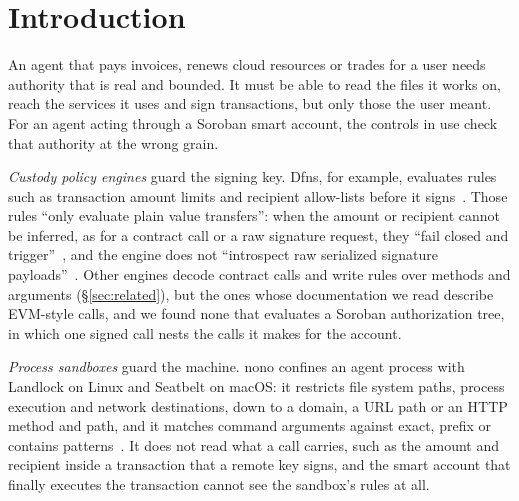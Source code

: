 \section{Introduction}\label{sec:intro}

An agent that pays invoices, renews cloud resources or trades for a user needs
authority that is real and bounded. It must be able to read the files it works
on, reach the services it uses and sign transactions, but only those the user
meant. For an agent acting through a Soroban smart account, the controls in
use check that authority at the wrong grain.

\emph{Custody policy engines} guard the signing key. Dfns, for example,
evaluates rules such as transaction amount limits and recipient allow-lists
before it signs~\cite{dfnsPolicies}. Those rules ``only evaluate plain value
transfers'': when the amount or recipient cannot be inferred, as for a contract
call or a raw signature request, they ``fail closed and
trigger''~\cite{dfnsPolicies}, and the engine does not ``introspect raw
serialized signature payloads''~\cite{dfnsSigningPolicies}. Other engines
decode contract calls and write rules over methods and arguments
(\S\ref{sec:related}), but the ones whose documentation we read describe
EVM-style calls, and we found none that evaluates a Soroban authorization
tree, in which one signed call nests the calls it makes for the account.

\emph{Process sandboxes} guard the machine. nono confines an agent process with
Landlock on Linux and Seatbelt on macOS: it restricts file system paths,
process execution and network destinations, down to a domain, a URL path or an
HTTP method and path, and it matches command arguments against exact, prefix or
contains patterns~\cite{nono}. It does not read what a call carries, such as
the amount and recipient inside a transaction that a remote key signs, and the
smart account that finally executes the transaction cannot see the sandbox's
rules at all.

